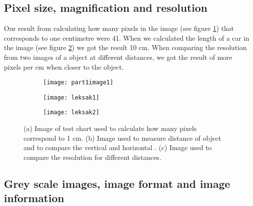 \subsection{Pixel size, magnification and resolution}
Our result from calculating how many pixels in the image (see figure \ref{fig:TestChart}) that corresponds to one centimetre were 41. When we calculated the length of a car in the image (see figure \ref{fig:Toy1}) we got the result 10 cm. When comparing the resolution from two images of a object at different distances, we got the result of more pixels per cm when closer to the object.

\begin{figure}[h]
	\centering
	\begin{subfigure}[b]{0.3\textwidth}
		\texttt{[image: part1image1]}
		\caption{}
		\label{fig:TestChart}
	\end{subfigure}
	\begin{subfigure}[b]{0.3\textwidth}
		\texttt{[image: leksak1]}
		\caption{}
		\label{fig:Toy1}
	\end{subfigure}
	\begin{subfigure}[b]{0.3\textwidth}
		\texttt{[image: leksak2]}
		\caption{}
		\label{fig:Toy2}
	\end{subfigure}
	\caption{(a) Image of test chart used to calculate how many pixels correspond to 1 cm. (b) Image used to measure distance of object and to compare the vertical and horizontal . (c) Image used to compare the resolution for different distances.}
	\label{fig:part1}
\end{figure}

\subsection{Grey scale images, image format and image information}
